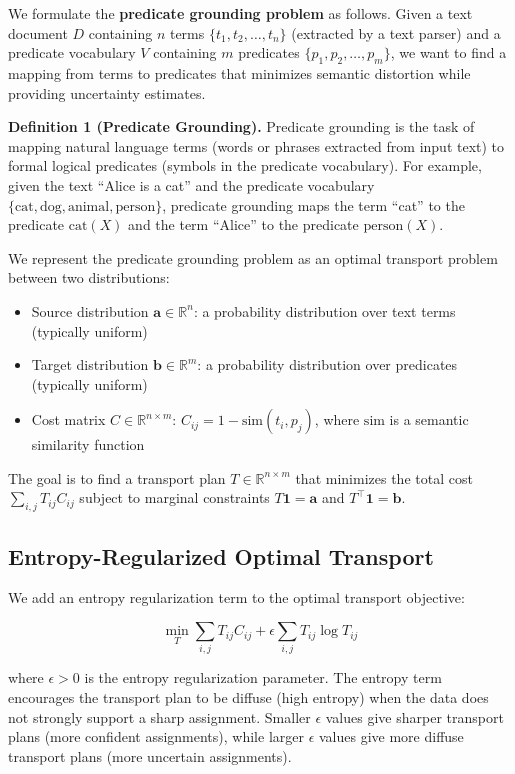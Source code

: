 \documentclass[11pt,letterpaper]{article}
\begin{document}
We formulate the \textbf{predicate grounding problem} as follows. Given a text document $D$ containing $n$ terms $\{t_1, t_2, \ldots, t_n\}$ (extracted by a text parser) and a predicate vocabulary $V$ containing $m$ predicates $\{p_1, p_2, \ldots, p_m\}$, we want to find a mapping from terms to predicates that minimizes semantic distortion while providing uncertainty estimates.

\textbf{Definition 1 (Predicate Grounding).} Predicate grounding is the task of mapping natural language terms (words or phrases extracted from input text) to formal logical predicates (symbols in the predicate vocabulary). For example, given the text ``Alice is a cat'' and the predicate vocabulary $\{\text{cat}, \text{dog}, \text{animal}, \text{person}\}$, predicate grounding maps the term ``cat'' to the predicate $\text{cat}(X)$ and the term ``Alice'' to the predicate $\text{person}(X)$.

We represent the predicate grounding problem as an optimal transport problem between two distributions:
\begin{itemize}[noitemsep]
\item Source distribution $\mathbf{a} \in \mathbb{R}^n$: a probability distribution over text terms (typically uniform)
\item Target distribution $\mathbf{b} \in \mathbb{R}^m$: a probability distribution over predicates (typically uniform)
\item Cost matrix $C \in \mathbb{R}^{n \times m}$: $C_{ij} = 1 - \text{sim}(t_i, p_j)$, where $\text{sim}$ is a semantic similarity function
\end{itemize}

The goal is to find a transport plan $T \in \mathbb{R}^{n \times m}$ that minimizes the total cost $\sum_{i,j} T_{ij} C_{ij}$ subject to marginal constraints $T \mathbf{1} = \mathbf{a}$ and $T^\top \mathbf{1} = \mathbf{b}$.

\subsection{Entropy-Regularized Optimal Transport}

We add an entropy regularization term to the optimal transport objective:

\begin{equation}
\min_T \sum_{i,j} T_{ij} C_{ij} + \epsilon \sum_{i,j} T_{ij} \log T_{ij}
\end{equation}

where $\epsilon > 0$ is the entropy regularization parameter. The entropy term encourages the transport plan to be diffuse (high entropy) when the data does not strongly support a sharp assignment. Smaller $\epsilon$ values give sharper transport plans (more confident assignments), while larger $\epsilon$ values give more diffuse transport plans (more uncertain assignments).
\end{document}
